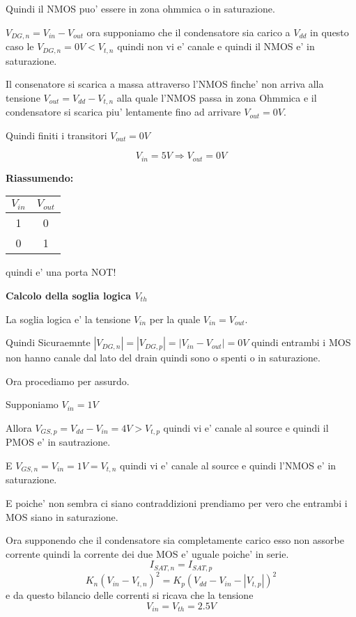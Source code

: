 \documentclass[\main/main.tex]{subfiles}
\begin{document}
Quindi il NMOS puo' essere in zona ohmmica o in saturazione.

$V_{DG,n} = V_{in} - V_{out}$ ora supponiamo che il condensatore sia carico a $V_{dd}$ in questo caso le $V_{DG,n} = 0V < V_{t,n}$ quindi non vi e' canale e quindi il NMOS e' in saturazione.

Il consenatore si scarica a massa attraverso l'NMOS finche' non arriva alla tensione $V_{out} = V_{dd} - V_{t,n}$ alla quale l'NMOS passa in zona Ohmmica e il condensatore si scarica piu' lentamente fino ad arrivare $V_{out} = 0V$.

Quindi finiti i transitori $V_{out} = 0V$

\[V_{in} = 5V \Rightarrow V_{out} = 0V\]

\textbf{Riassumendo:}
\begin{center}
\begin{tabular}{ c | c }
  $V_{in}$ & $V_{out}$ \\
  \hline			
  1 & 0\\ 		
  0 & 1\\
\end{tabular}
\end{center}
quindi e' una porta NOT!


\clearpage
\textbf{Calcolo della soglia logica $V_{th}$}

La soglia logica e' la tensione $V_{in}$ per la quale $V_{in} = V_{out}$.

Quindi Sicuraemnte $|V_{DG,n}| = |V_{DG,p}| = |V_{in} - V_{out}| = 0V$ quindi entrambi i MOS non hanno canale dal lato del drain quindi sono o spenti o in saturazione.

Ora procediamo per assurdo.

Supponiamo $V_{in} = 1V$

Allora $V_{GS,p} = V_{dd} - V_{in} = 4V > V_{t,p}$ quindi vi e' canale al source e quindi il PMOS e' in sautrazione.

E $V_{GS,n} = V_{in} = 1V = V_{t,n}$ quindi vi e' canale al source e quindi l'NMOS e' in saturazione.

E poiche' non sembra ci siano contraddizioni prendiamo per vero che entrambi i MOS siano in saturazione.

Ora supponendo che il condensatore sia completamente carico esso non assorbe corrente quindi la corrente dei due MOS e' uguale poiche' in serie.
\[I_{SAT,n} = I_{SAT,p}\]
\[K_n \left(V_{in} - V_{t,n} \right )^2 = K_p \left(V_{dd} - V_{in} - |V_{t,p}| \right )^2\]
e da questo bilancio delle correnti si ricava che la tensione
\[V_{in} = V_{th} = 2.5V\]
\end{document}
